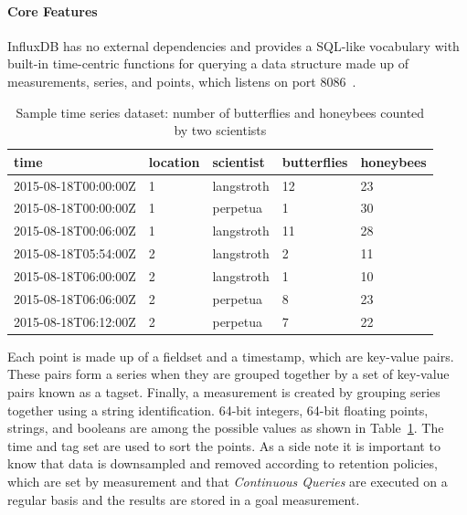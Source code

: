 \paragraph{Core Features}
InfluxDB has no external dependencies and provides a SQL-like vocabulary with built-in time-centric functions for querying a data structure made up of measurements, series, and points, which listens on port 8086~\cite{Misc:influx_docs}.

\begin{table}[ht]
    \centering
    \begin{tabular}{|l|l|l|l|l|}
        \hline
        time                 & location & scientist  & butterflies & honeybees \\ \hline
        2015-08-18T00:00:00Z & 1        & langstroth & 12          & 23        \\ \hline
        2015-08-18T00:00:00Z & 1        & perpetua   & 1           & 30        \\ \hline
        2015-08-18T00:06:00Z & 1        & langstroth & 11          & 28        \\ \hline
        2015-08-18T05:54:00Z & 2        & langstroth & 2           & 11        \\ \hline
        2015-08-18T06:00:00Z & 2        & langstroth & 1           & 10        \\ \hline
        2015-08-18T06:06:00Z & 2        & perpetua   & 8           & 23        \\ \hline
        2015-08-18T06:12:00Z & 2        & perpetua   & 7           & 22        \\ \hline
    \end{tabular}
    \caption{Sample time series dataset: number of butterflies and honeybees counted by two scientists}\label{tab:influx_example}
\end{table}

Each point is made up of a fieldset and a timestamp, which are key-value pairs. These pairs form a series when they are grouped together by a set of key-value pairs known as a tagset. Finally, a measurement is created by grouping series together using a string identification.
64-bit integers, 64-bit floating points, strings, and booleans are among the possible values as shown in Table~\ref{tab:influx_example}. The time and tag set are used to sort the points.
As a side note it is important to know that data is downsampled and removed according to retention policies, which are set by measurement and that \textit{Continuous Queries} are executed on a regular basis and the results are stored in a goal measurement.

